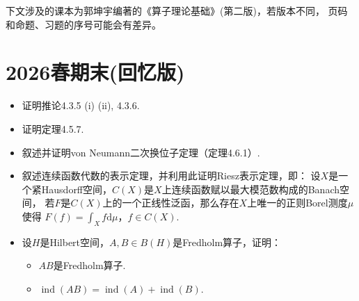 
下文涉及的课本为郭坤宇编著的《算子理论基础》(第二版)，若版本不同，
页码和命题、习题的序号可能会有差异。

\section{2026春期末(回忆版)}
\begin{itemize}
\item[一、]证明推论4.3.5 (i) (ii), 4.3.6.

\item[二、]证明定理4.5.7.

\item[三、]叙述并证明von Neumann二次换位子定理（定理4.6.1）.

\item[四、]叙述连续函数代数的表示定理，并利用此证明Riesz表示定理，即：
设$X$是一个紧Hausdorff空间，$C(X)$是$X$上连续函数赋以最大模范数构成的Banach空间，
若$F$是$C(X)$上的一个正线性泛函，那么存在$X$上唯一的正则Borel测度$\mu$使得
$F(f)=\displaystyle\int_X f\text{d}\mu$，$f\in C(X)$.

\item[五、]设$H$是Hilbert空间，$A,B\in B(H)$是Fredholm算子，证明：
\begin{itemize}
    \item[(1)]$AB$是Fredholm算子.
    \item[(2)]$\operatorname{ind}(AB)=\operatorname{ind}(A)+\operatorname{ind}(B)$.
\end{itemize}

\end{itemize}


